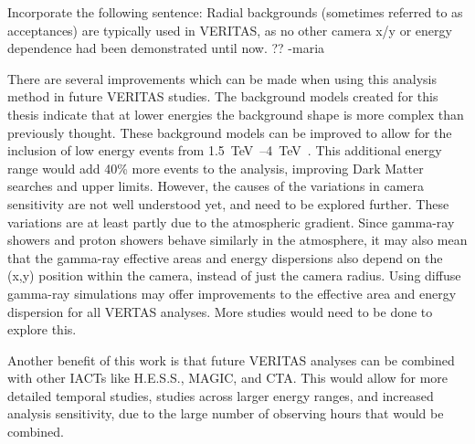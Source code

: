 {\color{red}Incorporate the following sentence: Radial backgrounds (sometimes referred to as acceptances) are typically used in VERITAS, as no other camera x/y or energy dependence had been demonstrated until now. ?? -maria}

There are several improvements which can be made when using this analysis method in future VERITAS studies.
The background models created for this thesis indicate that at lower energies the background shape is more complex than previously thought.
These background models can be improved to allow for the inclusion of low energy events from \SIrange{1.5}{4}{\TeV{}}.
This additional energy range would add \nicetilde{}40\% more events to the analysis, improving Dark Matter searches and upper limits.
However, the causes of the variations in camera sensitivity are not well understood yet, and need to be explored further.
These variations are at least partly due to the atmospheric gradient.
Since gamma-ray showers and proton showers behave similarly in the atmosphere, it may also mean that the gamma-ray effective areas and energy dispersions also depend on the (x,y) position within the camera, instead of just the camera radius.
Using diffuse gamma-ray simulations may offer improvements to the effective area and energy dispersion for all VERTAS analyses.
More studies would need to be done to explore this.

Another benefit of this work is that future VERITAS analyses can be combined with other IACTs like H.E.S.S., MAGIC, and CTA.
This would allow for more detailed temporal studies, studies across larger energy ranges, and increased analysis sensitivity, due to the large number of observing hours that would be combined.


